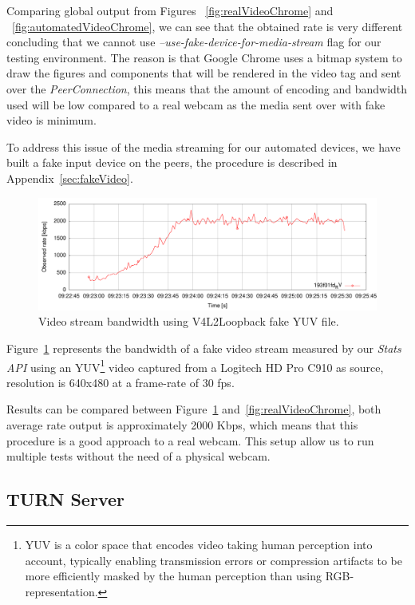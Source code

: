 Comparing global output from Figures ~\ref{fig:realVideoChrome} and ~\ref{fig:automatedVideoChrome}, we can see that the obtained rate is very different concluding that we cannot use {\it --use-fake-device-for-media-stream} flag for our testing environment. The reason is that Google Chrome uses a bitmap system to draw the figures and components that will be rendered in the video tag and sent over the {\it PeerConnection}, this means that the amount of encoding and bandwidth used will be low compared to a real webcam as the media sent over with fake video is minimum.

To address this issue of the media streaming for our automated devices, we have built a fake input device on the peers, the procedure is described in Appendix~\ref{sec:fakeVideo}.

 \begin{figure}[h]
  \centering
    \includegraphics[width=1\textwidth]{./figures/testV4L2niklas.pdf}
      \caption[Video stream bandwidth using V4L2Loopback fake YUV file]{Video stream bandwidth using V4L2Loopback fake YUV file.}
	\label{fig:testV4L2niklas}
\end{figure}

Figure~\ref{fig:testV4L2niklas} represents the bandwidth of a fake video stream measured by our {\it Stats API} using an YUV\footnote{YUV is a color space that encodes video taking human perception into account, typically enabling transmission errors or compression artifacts to be more efficiently masked by the human perception than using RGB-representation.} video captured from a Logitech HD Pro C910 as source, resolution is 640x480 at a frame-rate of 30 fps. 

Results can be compared between Figure~\ref{fig:testV4L2niklas} and~\ref{fig:realVideoChrome}, both average rate output is approximately 2000 Kbps, which means that this procedure is a good approach to a real webcam. This setup allow us to run multiple tests without the need of a physical webcam.

\subsection{TURN Server}

